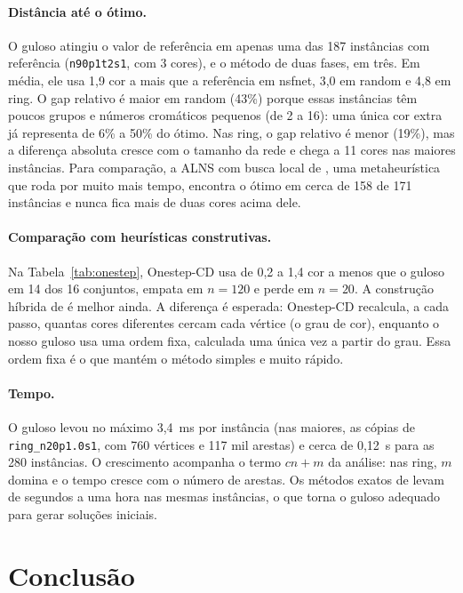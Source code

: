 \documentclass[12pt]{article}
\begin{document}
\paragraph{Distância até o ótimo.} O guloso atingiu o valor de referência em
apenas uma das 187 instâncias com referência (\texttt{n90p1t2s1}, com 3
cores), e o método de duas fases, em três. Em média, ele usa 1,9 cor a mais que a referência em nsfnet, 3,0 em
random e 4,8 em ring. O gap relativo é maior em random (43\%) porque essas
instâncias têm poucos grupos e números cromáticos pequenos (de 2 a 16): uma
única cor extra já representa de 6\% a 50\% do ótimo. Nas ring, o gap
relativo é menor (19\%), mas a diferença absoluta cresce com o tamanho da rede
e chega a 11 cores nas maiores instâncias. Para comparação, a ALNS com busca
local de \cite{furini2018}, uma metaheurística que roda por muito mais tempo,
encontra o ótimo em cerca de 158 de 171 instâncias e nunca fica mais de duas
cores acima dele.

\paragraph{Comparação com heurísticas construtivas.} Na
Tabela~\ref{tab:onestep}, Onestep-CD usa de 0,2 a 1,4 cor a menos que o guloso
em 14 dos 16 conjuntos, empata em $n=120$ e perde em $n=20$. A construção
híbrida de \cite{fritz2013} é melhor ainda. A diferença é esperada: Onestep-CD
recalcula, a cada passo, quantas cores diferentes cercam cada vértice (o grau
de cor), enquanto o nosso guloso usa uma ordem fixa, calculada uma única vez a
partir do grau. Essa ordem fixa é o que mantém o método simples e muito rápido.

\paragraph{Tempo.} O guloso levou no máximo 3,4~ms por instância (nas maiores,
as cópias de \texttt{ring\_n20p1.0s1}, com 760 vértices e 117 mil arestas) e
cerca de
0,12~s para as 280 instâncias. O crescimento acompanha o termo $cn+m$ da
análise: nas ring, $m$ domina e o tempo cresce com o número de arestas. Os
métodos exatos de \cite{furini2018} levam de segundos a uma hora nas mesmas
instâncias, o que torna o guloso adequado para gerar soluções iniciais.

\section{Conclusão}\label{sec:conclusao}
\end{document}
